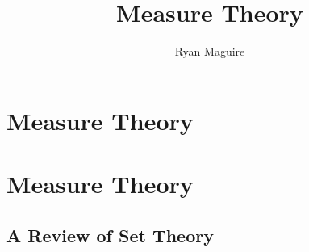\documentclass[crop=false,class=book,oneside]{standalone}
\begin{document}
    \ifx\ifmain\undefined
        \title{Measure Theory}
        \author{Ryan Maguire}
        \date{\vspace{-5ex}}
        \maketitle
        \tableofcontents
        \clearpage
        \chapter*{Measure Theory}
        \vspace{10ex}
        \setcounter{chapter}{1}
    \else
        \chapter{Measure Theory}
    \fi
    \section{A Review of Set Theory}
\end{document}
